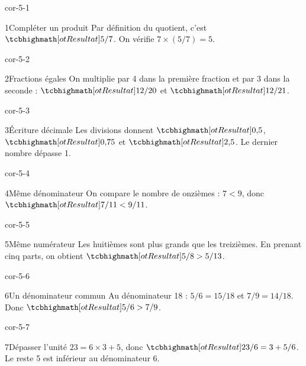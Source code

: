 \clearpage\pagestyle{otMain}\setlength{\otBlocEspacement}{2.5mm}\fontsize{11}{15}\selectfont{}
\begin{blocLivre}{cor-5-1}\begin{corrige}{1}{Compléter un produit}
Par définition du quotient, c’est $\res{5/7}$. On vérifie $7\times(5/7)=5$.
\end{corrige}\end{blocLivre}
\begin{blocLivre}{cor-5-2}\begin{corrige}{2}{Fractions égales}
On multiplie par 4 dans la première fraction et par 3 dans la seconde : $\res{12/20}$ et $\res{12/21}$.
\end{corrige}\end{blocLivre}
\begin{blocLivre}{cor-5-3}\begin{corrige}{3}{Écriture décimale}
Les divisions donnent $\res{0{,}5}$, $\res{0{,}75}$ et $\res{2{,}5}$. Le dernier nombre dépasse 1.
\end{corrige}\end{blocLivre}
\begin{blocLivre}{cor-5-4}\begin{corrige}{4}{Même dénominateur}
On compare le nombre de onzièmes : $7<9$, donc $\res{7/11<9/11}$.
\end{corrige}\end{blocLivre}
\begin{blocLivre}{cor-5-5}\begin{corrige}{5}{Même numérateur}
Les huitièmes sont plus grands que les treizièmes. En prenant cinq parts, on obtient $\res{5/8>5/13}$.
\end{corrige}\end{blocLivre}
\begin{blocLivre}{cor-5-6}\begin{corrige}{6}{Un dénominateur commun}
Au dénominateur 18 : $5/6=15/18$ et $7/9=14/18$. Donc $\res{5/6>7/9}$.
\end{corrige}\end{blocLivre}
\begin{blocLivre}{cor-5-7}\begin{corrige}{7}{Dépasser l’unité}
$23=6\times3+5$, donc $\res{23/6=3+5/6}$. Le reste 5 est inférieur au dénominateur 6.
\end{corrige}\end{blocLivre}
